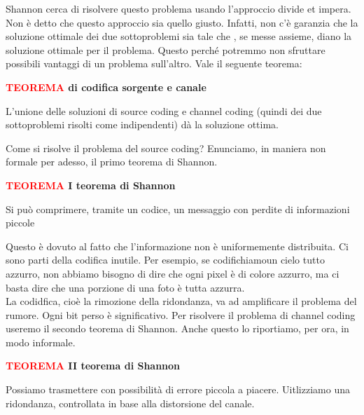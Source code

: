 \documentclass[12pt]{report}
\begin{document}
    \vspace{5px}
    \noindent
    Shannon cerca di risolvere questo problema usando l'approccio divide et impera. Non è detto che questo approccio sia quello giusto. Infatti, non c'è garanzia che la soluzione ottimale dei due sottoproblemi sia tale che , se messe assieme, diano la soluzione ottimale per il problema. Questo perché potremmo non sfruttare possibili vantaggi di un problema sull'altro. Vale il seguente teorema:
    \vspace{5px}
    \begin{tcolorbox}
        \textbf{\textcolor{red}{TEOREMA} di codifica sorgente e canale}
        \vspace{5px}
        \begin{center}
            L'unione delle soluzioni di source coding e channel coding (quindi dei due sottoproblemi risolti come indipendenti) dà la soluzione ottima.
        \end{center}
    \end{tcolorbox}

    \vspace{10px}

    \newpage
    \noindent Come si risolve il problema del source coding? Enunciamo, in maniera non formale per adesso, il primo teorema di Shannon.
    \vspace{5px}
    \begin{tcolorbox}
        \textbf{\textcolor{red}{TEOREMA} I teorema di Shannon}
        \vspace{5px}
        \begin{center}
            Si può comprimere, tramite un codice, un messaggio con perdite di informazioni piccole
        \end{center}
    \end{tcolorbox}
    \vspace{5px}
    \noindent Questo è dovuto al fatto che l'informazione non è uniformemente distribuita. Ci sono parti della codifica inutile. Per esempio, se codifichiamoun cielo tutto azzurro, non abbiamo bisogno di dire che ogni pixel è di colore azzurro, ma ci basta dire che una porzione di una foto è tutta azzurra.
    \\
    La codidfica, cioè la rimozione della ridondanza, va ad amplificare il problema del rumore. Ogni bit perso è significativo. Per risolvere il problema di channel coding useremo il secondo teorema di Shannon. Anche questo lo riportiamo, per ora, in modo informale.

    \vspace{5px}
    \begin{tcolorbox}
        \textbf{\textcolor{red}{TEOREMA} II teorema di Shannon}
        \vspace{5px}
        \begin{center}
            Possiamo trasmettere con possibilità di errore piccola a piacere. Uitlizziamo una ridondanza, controllata in base alla distorsione del canale.
        \end{center}
    \end{tcolorbox}
\end{document}

